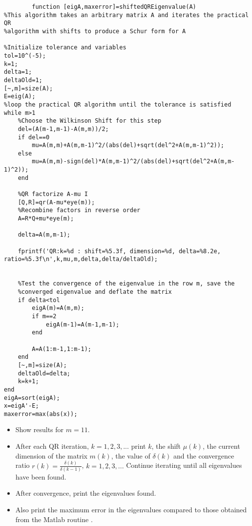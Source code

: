 \documentclass[12pt]{article}
\numberwithin{equation}{section}
\begin{document}
\begin{enumerate}
        \begin{lstlisting}
        function [eigA,maxerror]=shiftedQREigenvalue(A)
%This algorithm takes an arbitrary matrix A and iterates the practical QR
%algorithm with shifts to produce a Schur form for A

%Initialize tolerance and variables
tol=10^(-5);
k=1;
delta=1;
deltaOld=1;
[~,m]=size(A);
E=eig(A);
%loop the practical QR algorithm until the tolerance is satisfied
while m>1
    %Choose the Wilkinson Shift for this step
    del=(A(m-1,m-1)-A(m,m))/2;
    if del==0
        mu=A(m,m)+A(m,m-1)^2/(abs(del)+sqrt(del^2+A(m,m-1)^2));
    else
        mu=A(m,m)-sign(del)*A(m,m-1)^2/(abs(del)+sqrt(del^2+A(m,m-1)^2));
    end

    %QR factorize A-mu I
    [Q,R]=qr(A-mu*eye(m));
    %Recombine factors in reverse order
    A=R*Q+mu*eye(m);

    delta=A(m,m-1);

    fprintf('QR:k=%d : shift=%5.3f, dimension=%d, delta=%8.2e, ratio=%5.3f\n',k,mu,m,delta,delta/deltaOld);


    %Test the convergence of the eigenvalue in the row m, save the
    %converged eigenvalue and deflate the matrix
    if delta<tol
        eigA(m)=A(m,m);
        if m==2
            eigA(m-1)=A(m-1,m-1);
        end

        A=A(1:m-1,1:m-1);
    end
    [~,m]=size(A);
    deltaOld=delta;
    k=k+1;
end
eigA=sort(eigA);
x=eigA'-E;
maxerror=max(abs(x));
\end{lstlisting}
        \begin{itemize}
            \item Show results for $m=11$.
            \item After each QR iteration, $k=1,2,3,...$ print $k$, the shift $\mu(k)$, the current dimension of the matrix $m(k)$, the value of $\delta(k)$ and the convergence ratio $r(k)=\frac{\delta(k)}{\delta(k-1)}$, $k=1,2,3,...$ Continue iterating until all eigenvalues have been found.
            \item After convergence, print the eigenvalues found.
            \item Also print the maximum error in the eigenvalues compared to those obtained from the Matlab routine .
                

\end{itemize}
\end{enumerate}
\end{document}
